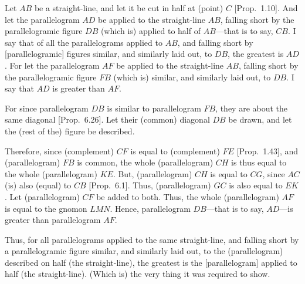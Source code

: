 \begin{Parallel}{}{}
{Let $AB$ be a straight-line, and let it be cut in half at
(point) $C$ [Prop.~1.10]. And let the parallelogram $AD$ be applied to the straight-line
$AB$, 
falling short by the parallelogramic figure $DB$ (which is) applied to
half of $AB$---that is to say, $CB$. I say that of all  the parallelograms applied to $AB$, and
falling short by  [parallelogramic] figures similar, and similarly
laid out, to $DB$, the greatest is $AD$. For let the parallelogram
$AF$ be applied to the straight-line $AB$, falling short by
the parallelogramic figure $FB$ (which is) similar, and similarly laid out,
to $DB$. I say that $AD$ is greater than $AF$.

\epsfysize=2in
\centerline{}

For since parallelogram $DB$ is similar to parallelogram $FB$, they are
about the same diagonal [Prop.~6.26].
Let their (common) diagonal $DB$ be drawn, and let the (rest of the)  figure be
described.

Therefore, since (complement) $CF$ is equal to (complement) $FE$  [Prop.~1.43],
and (parallelogram) $FB$ is common, the whole (parallelogram) $CH$ is thus
equal to the whole (parallelogram) $KE$. But, (parallelogram)
$CH$ is equal to $CG$, since $AC$ (is) also (equal) to $CB$ [Prop.~6.1]. Thus, (parallelogram) $GC$ is also equal to $EK$. 
Let (parallelogram) $CF$ be added to both. Thus, the whole (parallelogram) $AF$
is equal to the gnomon $LMN$. Hence, parallelogram $DB$---that is
to say, $AD$---is greater than parallelogram $AF$.

Thus, for all parallelograms applied to the
same straight-line, and falling short by a parallelogramic figure
similar, and similarly laid out, to the (parallelogram)
described on half (the straight-line), the greatest is the [parallelogram]
applied to half (the straight-line). (Which is) the very thing it was required
to show.}
\end{Parallel}

